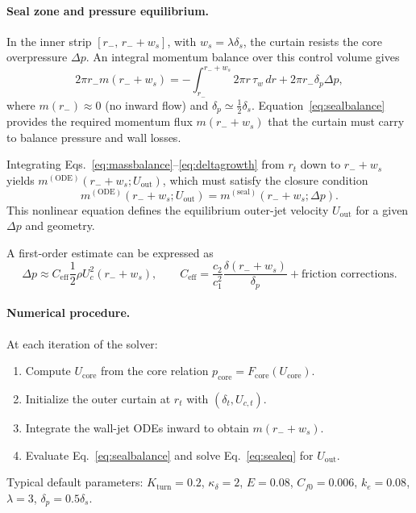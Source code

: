 \documentclass[11pt,a4paper]{article}
\begin{document}
\paragraph{Seal zone and pressure equilibrium.}
In the inner strip $[r_-,\, r_- + w_s]$, with $w_s = \lambda \delta_s$,
the curtain resists the core overpressure $\Delta p$.
An integral momentum balance over this control volume gives
\begin{equation}
2\pi r_- m(r_-+w_s)
= -\!\!\int_{r_-}^{r_-+w_s} 2\pi r\,\tau_w\,dr
+ 2\pi r_- \delta_p \Delta p,
\label{eq:sealbalance}
\end{equation}
where $m(r_-)\!\approx\!0$ (no inward flow) and $\delta_p\simeq\tfrac12\delta_s$.
Equation~\eqref{eq:sealbalance} provides the required momentum flux $m(r_-+w_s)$
that the curtain must carry to balance pressure and wall losses.

Integrating Eqs.~\eqref{eq:massbalance}--\eqref{eq:deltagrowth} from $r_t$ down to $r_-+w_s$
yields $m^{(\mathrm{ODE})}(r_-+w_s; U_{\mathrm{out}})$,
which must satisfy the closure condition
\begin{equation}
m^{(\mathrm{ODE})}(r_-+w_s; U_{\mathrm{out}})
= m^{(\mathrm{seal})}(r_-+w_s; \Delta p).
\label{eq:sealeq}
\end{equation}
This nonlinear equation defines the equilibrium outer-jet velocity $U_{\mathrm{out}}$
for a given $\Delta p$ and geometry.

A first-order estimate can be expressed as
\begin{equation}
\Delta p \approx C_{\mathrm{eff}} \frac12 \rho U_c^2(r_-+w_s),
\qquad
C_{\mathrm{eff}} = \frac{c_2}{c_1^2}\frac{\delta(r_-+w_s)}{\delta_p} + \text{friction corrections.}
\end{equation}

\paragraph{Numerical procedure.}
At each iteration of the solver:
\begin{enumerate}
  \item Compute $U_{\mathrm{core}}$ from the core relation
  $p_{\mathrm{core}} = F_{\mathrm{core}}(U_{\mathrm{core}})$.
  \item Initialize the outer curtain at $r_t$ with $(\delta_t, U_{c,t})$.
  \item Integrate the wall-jet ODEs inward to obtain $m(r_-+w_s)$.
  \item Evaluate Eq.~\eqref{eq:sealbalance} and solve Eq.~\eqref{eq:sealeq} for $U_{\mathrm{out}}$.
\end{enumerate}
Typical default parameters: $K_{\mathrm{turn}}=0.2$, $\kappa_\delta=2$,
$E=0.08$, $C_{f0}=0.006$, $k_e=0.08$, $\lambda=3$, $\delta_p=0.5\delta_s$.
\end{document}
